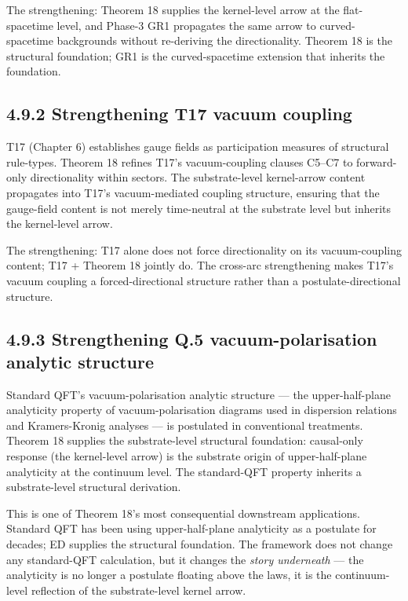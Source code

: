 \documentclass[11pt]{book}
\begin{document}
The strengthening: Theorem 18 supplies the kernel-level arrow at the flat-spacetime level, and Phase-3 GR1 propagates the same arrow to curved-spacetime backgrounds without re-deriving the directionality. Theorem 18 is the structural foundation; GR1 is the curved-spacetime extension that inherits the foundation.

\subsection{4.9.2 Strengthening T17 vacuum coupling}

T17 (Chapter 6) establishes gauge fields as participation measures of structural rule-types. Theorem 18 refines T17's vacuum-coupling clauses C5–C7 to forward-only directionality within sectors. The substrate-level kernel-arrow content propagates into T17's vacuum-mediated coupling structure, ensuring that the gauge-field content is not merely time-neutral at the substrate level but inherits the kernel-level arrow.

The strengthening: T17 alone does not force directionality on its vacuum-coupling content; T17 + Theorem 18 jointly do. The cross-arc strengthening makes T17's vacuum coupling a forced-directional structure rather than a postulate-directional structure.

\subsection{4.9.3 Strengthening Q.5 vacuum-polarisation analytic structure}

Standard QFT's vacuum-polarisation analytic structure — the upper-half-plane analyticity property of vacuum-polarisation diagrams used in dispersion relations and Kramers-Kronig analyses — is postulated in conventional treatments. Theorem 18 supplies the substrate-level structural foundation: causal-only response (the kernel-level arrow) is the substrate origin of upper-half-plane analyticity at the continuum level. The standard-QFT property inherits a substrate-level structural derivation.

This is one of Theorem 18's most consequential downstream applications. Standard QFT has been using upper-half-plane analyticity as a postulate for decades; ED supplies the structural foundation. The framework does not change any standard-QFT calculation, but it changes the \textit{story underneath} — the analyticity is no longer a postulate floating above the laws, it is the continuum-level reflection of the substrate-level kernel arrow.
\end{document}
